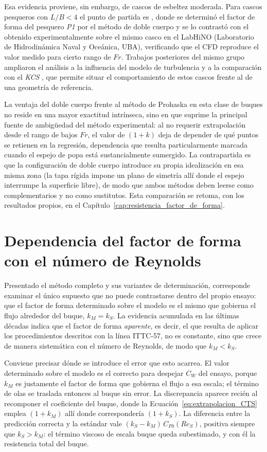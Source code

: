 Esa evidencia proviene, sin embargo, de cascos de esbeltez moderada. Para cascos
pesqueros con $L/B < 4$ el punto de partida es \citet{oyuela2024jmse}, donde se
determinó el factor de forma del pesquero \textit{P1} por el método de doble cuerpo y se lo
contrastó con el obtenido experimentalmente sobre el mismo casco en el LabHiNO
(Laboratorio de Hidrodinámica Naval y Oceánica, UBA), verificando que el CFD
reproduce el valor medido para cierto rango de $Fr$. Trabajos posteriores del mismo grupo ampliaron el
análisis a la influencia del modelo de turbulencia \citep{oyuela2025mecanica} y a
la comparación con el \textit{KCS} \citep{oyuela2026oceaneng}, que permite situar
el comportamiento de estos cascos frente al de una geometría de referencia.

La ventaja del doble cuerpo frente al método de Prohaska en esta clase de buques no reside en
una mayor exactitud intrínseca, sino en que suprime la principal fuente de
ambigüedad del método experimental: al no requerir extrapolación desde el rango de
bajos $Fr$, el valor de $(1+k)$ deja de depender de qué puntos se retienen en la
regresión, dependencia que resulta particularmente marcada cuando el espejo de
popa está sustancialmente sumergido. La contrapartida es que la configuración de
doble cuerpo introduce su propia idealización en esa misma zona (la tapa rígida
impone un plano de simetría allí donde el espejo interrumpe la superficie libre),
de modo que ambos métodos deben leerse como complementarios y no como sustitutos.
Esta comparación se retoma, con los resultados propios, en el
Capítulo~\ref{cap:resistencia_factor_de_forma}.

\section{Dependencia del factor de forma con el número de Reynolds}
\label{sec:k_vs_Re}

Presentado el método completo y sus variantes de determinación, corresponde
examinar el único supuesto que no puede contrastarse dentro del propio ensayo:
que el factor de forma determinado sobre el modelo es el mismo que gobierna el
flujo alrededor del buque, $k_M = k_S$. La evidencia acumulada en las últimas
décadas indica que el factor de forma \emph{aparente}, es decir, el que resulta de
aplicar los procedimientos descritos con la línea ITTC-57, no es constante,
sino que crece de manera sistemática con el número de Reynolds, de modo que
$k_M < k_S$.

Conviene precisar dónde se introduce el error que esto acarrea. El valor
determinado sobre el modelo es el correcto para despejar $C_W$ del ensayo, porque
$k_M$ es justamente el factor de forma que gobierna el flujo a esa escala; el
término de olas se traslada entonces al buque sin error. La discrepancia aparece
recién al recomponer el coeficiente del buque, donde la
Ecuación~\eqref{eq:extrapolacion_CTS} emplea $(1+k_M)$ allí donde correspondería
$(1+k_S)$. La diferencia entre la predicción correcta y la estándar vale
$(k_S - k_M)\,C_{F0}(Re_S)$, positiva siempre que $k_S > k_M$: el término viscoso
de escala buque queda subestimado, y con él la resistencia total del buque.

